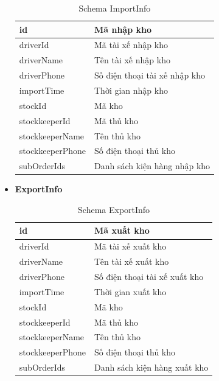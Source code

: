 \begin{itemize}
		\begin{table}[H]
			\centering\begin{tabular}{|l|m{30em}|}
				\hline 
				id & Mã nhập kho\\
				\hline 
				driverId & Mã tài xế nhập kho\\ 
				\hline
				driverName & Tên tài xế nhập kho \\
				\hline 
				driverPhone & Số điện thoại tài xế nhập kho \\
				\hline
				importTime & Thời gian nhập kho \\
				\hline
				stockId & Mã kho \\
				\hline
				stockkeeperId & Mã thủ kho \\
				\hline
				stockkeeperName & Tên thủ kho \\
				\hline
				stockkeeperPhone & Số điện thoại thủ kho \\
				\hline
				subOrderIds & Danh sách kiện hàng nhập kho \\
				\hline
			\end{tabular}
			\caption{Schema ImportInfo}
		\end{table}
	
	\newpage
	
	
		\item \textbf{ExportInfo}
		
		\begin{table}[H]
			\centering\begin{tabular}{|l|m{30em}|}
				\hline 
				id & Mã xuất kho\\
				\hline 
				driverId & Mã tài xế xuất kho\\ 
				\hline
				driverName & Tên tài xế xuất kho \\
				\hline 
				driverPhone & Số điện thoại tài xế xuất kho \\
				\hline
				importTime & Thời gian xuất kho \\
				\hline
				stockId & Mã kho \\
				\hline
				stockkeeperId & Mã thủ kho \\
				\hline
				stockkeeperName & Tên thủ kho \\
				\hline
				stockkeeperPhone & Số điện thoại thủ kho \\
				\hline
				subOrderIds & Danh sách kiện hàng xuất kho \\
				\hline
			\end{tabular}
			\caption{Schema ExportInfo}
		\end{table}


\end{itemize}
